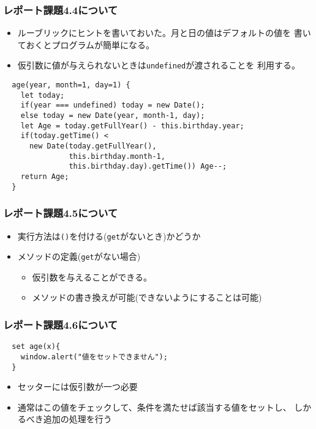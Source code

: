 \begin{frame}[containsverbatim]
 \frametitle{レポート課題4.4について}
\begin{itemize}
 \item ルーブリックにヒントを書いておいた。月と日の値はデフォルトの値を
       書いておくとプログラムが簡単になる。
 \item 仮引数に値が与えられないときは\texttt{undefined}が渡されることを
       利用する。
\end{itemize}
 {\small
\begin{Verbatim}
  age(year, month=1, day=1) {
    let today;
    if(year === undefined) today = new Date();
    else today = new Date(year, month-1, day);
    let Age = today.getFullYear() - this.birthday.year;
    if(today.getTime() <
      new Date(today.getFullYear(),
               this.birthday.month-1,
               this.birthday.day).getTime()) Age--;
    return Age;
  }
\end{Verbatim}
 }
\end{frame}
\begin{frame}[containsverbatim]
 \frametitle{レポート課題4.5について}
 \begin{itemize}
  \item 実行方法は\texttt{()}を付ける(\texttt{get}がないとき)かどうか
  \item メソッドの定義(\texttt{get}がない場合)
        \begin{itemize}
         \item 仮引数を与えることができる。
         \item メソッドの書き換えが可能(できないようにすることは可能)
        \end{itemize}
 \end{itemize}
\end{frame}
\begin{frame}[containsverbatim]
 \frametitle{レポート課題4.6について}
\begin{Verbatim}
  set age(x){
    window.alert("値をセットできません");
  }
\end{Verbatim}
\begin{itemize}
 \item セッターには仮引数が一つ必要
 \item 通常はこの値をチェックして、条件を満たせば該当する値をセットし、
       しかるべき追加の処理を行う
\end{itemize}
\end{frame}
